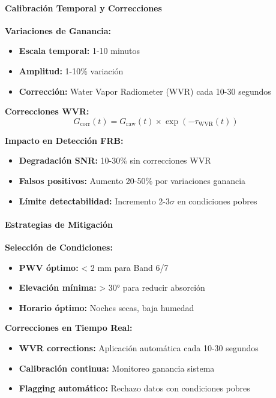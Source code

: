 \paragraph{Calibración Temporal y Correcciones}

\textbf{Variaciones de Ganancia:}
\begin{itemize}
\item \textbf{Escala temporal:} 1-10 minutos
\item \textbf{Amplitud:} 1-10\% variación
\item \textbf{Corrección:} Water Vapor Radiometer (WVR) cada 10-30 segundos
\end{itemize}

\textbf{Correcciones WVR:}
\[
G_{\text{corr}}(t) = G_{\text{raw}}(t) \times \exp(-\tau_{\text{WVR}}(t))
\]

\textbf{Impacto en Detección FRB:}
\begin{itemize}
\item \textbf{Degradación SNR:} 10-30\% sin correcciones WVR
\item \textbf{Falsos positivos:} Aumento 20-50\% por variaciones ganancia
\item \textbf{Límite detectabilidad:} Incremento 2-3$\sigma$ en condiciones pobres
\end{itemize}

\paragraph{Estrategias de Mitigación}

\textbf{Selección de Condiciones:}
\begin{itemize}
\item \textbf{PWV óptimo:} < 2 mm para Band 6/7
\item \textbf{Elevación mínima:} > 30° para reducir absorción
\item \textbf{Horario óptimo:} Noches secas, baja humedad
\end{itemize}

\textbf{Correcciones en Tiempo Real:}
\begin{itemize}
\item \textbf{WVR corrections:} Aplicación automática cada 10-30 segundos
\item \textbf{Calibración continua:} Monitoreo ganancia sistema
\item \textbf{Flagging automático:} Rechazo datos con condiciones pobres
\end{itemize}

